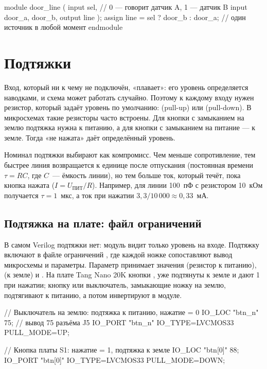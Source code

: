 \begin{vcode}
module door_line (
    input  sel,                 // 0 --- говорит датчик A, 1 --- датчик B
    input  door_a, door_b,
    output line
);
    assign line = sel ? door_b : door_a;   // один источник в любой момент
endmodule
\end{vcode}


\section{Подтяжки}

Вход, который ни к чему не подключён, «плавает»: его уровень определяется
наводками, и схема может работать случайно. Поэтому к каждому входу нужен
резистор, который задаёт уровень по умолчанию: 
(pull-up) или  (pull-down). В микросхемах такие резисторы
часто встроены. Для кнопки с замыканием на землю подтяжка нужна к питанию, а
для кнопки с замыканием на питание --- к земле. Тогда «не нажата» даёт
определённый уровень.

Номинал подтяжки выбирают как компромисс. Чем меньше сопротивление, тем быстрее
линия возвращается к единице после отпускания (постоянная времени
$\tau = RC$, где $C$~--- ёмкость линии), но тем больше ток, который течёт, пока
кнопка нажата ($I = U_\text{ПИТ}/R$). Например, для линии 100~пФ с резистором
10~кОм получается $\tau = 1$~мкс, а ток при нажатии $3{,}3/10\,000 \approx
0{,}33$~мА.

\subsection{Подтяжка на плате: файл ограничений}

В самом Verilog подтяжки нет: модуль видит только уровень на входе. Подтяжку
включают в файле ограничений , где каждой ножке сопоставляют вывод
микросхемы и параметры. Параметр  принимает значения
 (резистор к питанию),  (к земле) и . На плате
Tang Nano 20K кнопки ,  уже подтянуты к земле и дают 1 при
нажатии; кнопку или выключатель, замыкающие ножку на землю, подтягивают к
питанию, а потом инвертируют в модуле.


\begin{vcode}[text]
// Выключатель на землю: подтяжка к питанию, нажатие = 0
IO_LOC  "btn_n" 75;                          // вывод 75 разъёма J5
IO_PORT "btn_n" IO_TYPE=LVCMOS33 PULL_MODE=UP;

// Кнопка платы S1: нажатие = 1, подтяжка к земле
IO_LOC  "btn[0]" 88;
IO_PORT "btn[0]" IO_TYPE=LVCMOS33 PULL_MODE=DOWN;
\end{vcode}

